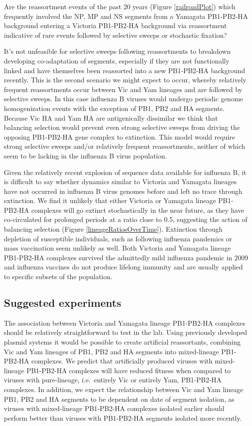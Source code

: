 \documentclass[11pt,oneside,letterpaper]{article}
\begin{document}
Are the reassortment events of the past 20 years (Figure \ref{railroadPlot}) which frequently involved the NP, MP and NS segments from a Yamagata PB1-PB2-HA background entering a Victoria PB1-PB2-HA background via reassortment indicative of rare events followed by selective sweeps or stochastic fixation?

It's not unfeasible for selective sweeps following reassortments to breakdown developing co-adaptation of segments, especially if they are not functionally linked and have themselves been reassorted into a new PB1-PB2-HA background recently.
This is the second scenario we might expect to occur, whereby relatively frequent reassortments occur between Vic and Yam lineages and are followed by selective sweeps.
In this case influenza B viruses would undergo periodic genome homogenization events with the exception of PB1, PB2 and HA segments.
Because Vic HA and Yam HA are antigenically dissimilar we think that balancing selection would prevent even strong selective sweeps from driving the opposing PB1-PB2-HA gene complex to extinction.
This model would require strong selective sweeps and/or relatively frequent reassortments, neither of which seem to be lacking in the influenza B virus population.

Given the relatively recent explosion of sequence data available for influenza B, it is difficult to say whether dynamics similar to Victoria and Yamagata lineages have not occurred in influenza B virus genomes before and left no trace through extinction.
We find it unlikely that either Victoria or Yamagata lineage PB1-PB2-HA complexes will go extinct stochastically in the near future, as they have co-circulated for prolonged periods at a ratio close to 0.5, suggesting the action of balancing selection (Figure \ref{lineageRatiosOverTime}).
Extinction through depletion of susceptible individuals, such as following influenza pandemics or mass vaccination seem unlikely as well.
Both Victoria and Yamagata lineage PB1-PB2-HA complexes survived the admittedly mild influenza pandemic in 2009 and influenza vaccines do not produce lifelong immunity and are usually applied to specific subsets of the population.

\subsection*{Suggested experiments}
The association between Victoria and Yamagata lineage PB1-PB2-HA complexes should be relatively straightforward to test in the lab.
Using previously developed plasmid systems \cite{hoffmann2002} it would be possible to create artificial reassortants, combining Vic and Yam lineages of PB1, PB2 and HA segments into mixed-lineage PB1-PB2-HA complexes.
We predict that artificially produced viruses with mixed-lineage PB1-PB2-HA complexes will have reduced fitness when compared to viruses with pure-lineage, i.e.\ entirely Vic or entirely Yam, PB1-PB2-HA complexes.
In addition, we expect the relationship between Vic and Yam lineage PB1, PB2 and HA segments to be dependent on date of segment isolation, as viruses with mixed-lineage PB1-PB2-HA complexes isolated earlier should perform better than viruses with PB1-PB2-HA segments isolated more recently.
\end{document}

